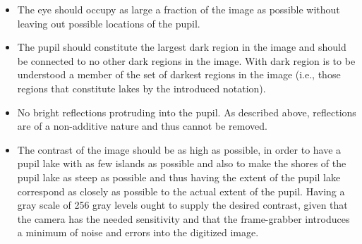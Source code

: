 \begin{itemize}
\item The eye should occupy as large a fraction of the image as
  possible without leaving out possible locations of the pupil.
\item The pupil should constitute the largest dark region in the
  image and should be connected to no other dark regions in the
  image.  With dark region is to be understood a member of the set of
  darkest regions in the image (i.e., those regions that constitute
  lakes by the introduced notation).
\item No bright reflections protruding into the pupil.  As described
  above, reflections are of a non-additive nature and thus cannot be
  removed.
\item The contrast of the image should be as high as possible, in
  order to have a pupil lake with as few islands as possible and also
  to make the shores of the pupil lake as steep as possible and thus
  having the extent of the pupil lake correspond as closely as
  possible to the actual extent of the pupil.  Having a gray scale of
  256 gray levels ought to supply the desired contrast, given that the
  camera has the needed sensitivity and that the frame-grabber
  introduces a minimum of noise and errors into the digitized image.
\end{itemize}
